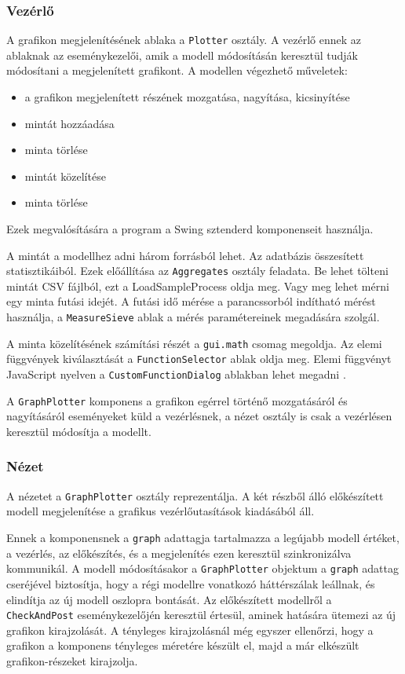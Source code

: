 \subsubsection{Vezérlő}

A grafikon megjelenítésének ablaka a \texttt{Plotter} osztály.
A vezérlő ennek az ablaknak az eseménykezelői, amik a modell módosításán keresztül tudják módosítani a megjelenített grafikont.
A modellen végezhető műveletek:
\begin{itemize}
\item a grafikon megjelenített részének mozgatása, nagyítása, kicsinyítése
\item mintát hozzáadása
\item minta törlése
\item mintát közelítése
\item minta törlése
\end{itemize}
Ezek megvalósítására a program a Swing sztenderd komponenseit használja.

A mintát a modellhez adni három forrásból lehet.
Az adatbázis összesített statisztikáiból.
Ezek előállítása az \texttt{Aggregates} osztály feladata.
Be lehet tölteni mintát CSV fájlból, ezt a LoadSampleProcess oldja meg.
Vagy meg lehet mérni egy minta futási idejét.
A futási idő mérése a parancssorból indítható mérést használja, a \texttt{MeasureSieve} ablak a mérés paramétereinek megadására szolgál.

A minta közelítésének számítási részét a \texttt{gui.math} csomag megoldja.
Az elemi függvények kiválasztását a \texttt{FunctionSelector} ablak oldja meg.
Elemi függvényt JavaScript nyelven a \texttt{CustomFunctionDialog} ablakban lehet megadni .

A \texttt{GraphPlotter} komponens a grafikon egérrel történő mozgatásáról és nagyításáról eseményeket küld a vezérlésnek, a nézet osztály is csak a vezérlésen keresztül módosítja a modellt.

\subsubsection{Nézet}

A nézetet a \texttt{GraphPlotter} osztály reprezentálja.
A két részből álló előkészített modell megjelenítése a grafikus vezérlőutasítások kiadásából áll.

Ennek a komponensnek a \texttt{graph} adattagja tartalmazza a legújabb modell értéket, a vezérlés, az előkészítés, és a megjelenítés ezen keresztül szinkronizálva kommunikál.
A modell módosításakor a \texttt{GraphPlotter} objektum a \texttt{graph} adattag cseréjével biztosítja, hogy a régi modellre vonatkozó háttérszálak leállnak, és elindítja az új modell oszlopra bontását.
Az előkészített modellről a \texttt{CheckAndPost} eseménykezelőjén keresztül értesül, aminek hatására ütemezi az új grafikon kirajzolását.
A tényleges kirajzolásnál még egyszer ellenőrzi, hogy a grafikon a komponens tényleges méretére készült el, majd a már elkészült grafikon-részeket kirajzolja.

